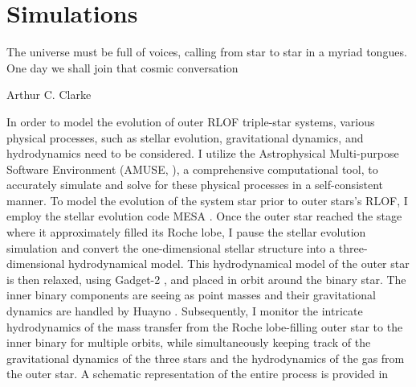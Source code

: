 \chapter{Simulations}\label{simulations}

\epigraph{The universe must be full of voices, calling from star to star in a myriad tongues. One day we shall join that cosmic conversation}{Arthur C. Clarke}


In order to model the evolution of outer RLOF triple-star systems, various physical processes, such as stellar evolution, gravitational dynamics, and hydrodynamics need to be considered. I utilize the Astrophysical Multi-purpose Software Environment (AMUSE, \cite{portegies2018astrophysical}), a comprehensive computational tool, to accurately simulate and solve for these physical processes in a self-consistent manner. To model the evolution of the system star prior to outer stars's RLOF, I employ the stellar evolution code MESA \citep{paxton2010modules,paxton2013modules,paxton2015modules,paxton2019modules}. Once the outer star reached the stage where it approximately filled its Roche lobe, I pause the stellar evolution simulation and convert the one-dimensional stellar structure into a three-dimensional hydrodynamical model. This hydrodynamical model of the outer star is then relaxed, using Gadget-2 \citep{springel2005cosmological}, and placed in orbit around the binary star. The inner binary components are seeing as point masses and their gravitational dynamics are handled by Huayno \citep{pelupessy2012n}. Subsequently, I monitor the intricate hydrodynamics of the mass transfer from the Roche lobe-filling outer star to the inner binary for multiple orbits, while simultaneously keeping track of the gravitational dynamics of the three stars and the hydrodynamics of the gas from the outer star.  A schematic representation of the entire process is provided in 




